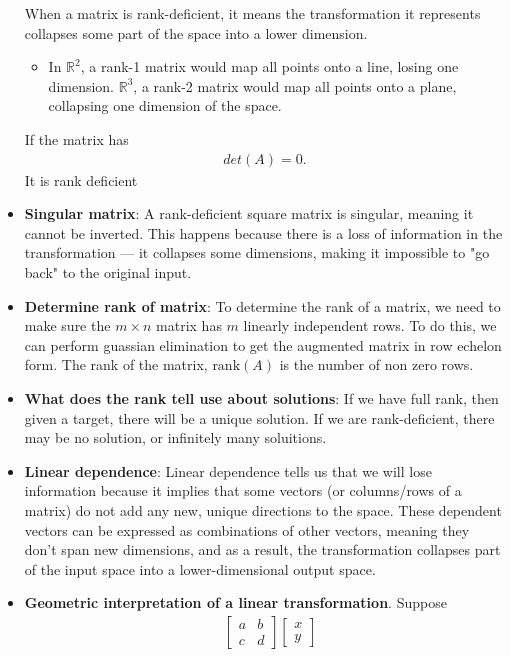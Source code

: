 \documentclass{report}
\begin{document}
\begin{itemize}
            \bigbreak \noindent 
            When a matrix is rank-deficient, it means the transformation it represents collapses some part of the space into a lower dimension. 
            \begin{itemize}
                \item In $\mathbb{R}^{2}$, a rank-1 matrix would map all points onto a line, losing one dimension. $\mathbb{R}^{3}$, a rank-2 matrix would map all points onto a plane, collapsing one dimension of the space.
            \end{itemize}
            If the matrix has 
            \begin{align*}
                det(A) = 0
            .\end{align*}
            It is rank deficient

        \item \textbf{Singular matrix}: A rank-deficient square matrix is singular, meaning it cannot be inverted. This happens because there is a loss of information in the transformation — it collapses some dimensions, making it impossible to "go back" to the original input.
        \item \textbf{Determine rank of matrix}: To determine the rank of a matrix, we need to make sure the $m\times n$ matrix has $m$ linearly independent rows. To do this, we can perform guassian elimination to get the augmented matrix in row echelon form. The rank of the matrix, $\text{rank}(A)$ is the number of non zero rows.
        \item \textbf{What does the rank tell use about solutions}: If we have full rank, then given a target, there will be a unique solution. If we are rank-deficient, there may be no solution, or infinitely many soluitions.
        \item \textbf{Linear dependence}: Linear dependence tells us that we will lose information because it implies that some vectors (or columns/rows of a matrix) do not add any new, unique directions to the space. These dependent vectors can be expressed as combinations of other vectors, meaning they don't span new dimensions, and as a result, the transformation collapses part of the input space into a lower-dimensional output space.
        \item \textbf{Geometric interpretation of a linear transformation}. Suppose 
        \begin{align*}
            &\begin{bmatrix}a & b \\ c & d \end{bmatrix} \begin{bmatrix} x \\ y \end{bmatrix} \\

\end{align*}
\end{itemize}
\end{document}

